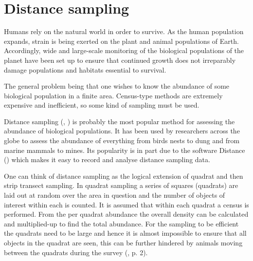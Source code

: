 
\section{Distance sampling}
\label{intro-DS}

Humans rely on the natural world in order to survive. As the human population expands, strain is being exerted on the plant and animal populations of Earth. Accordingly, wide and large-scale monitoring of the biological populations of the planet have been set up to ensure that continued growth does not irreparably damage populations and habitats essential to survival.

The general problem being that one wishes to know the abundance of some biological population in a finite area. Census-type methods are extremely expensive and inefficient, so some kind of sampling must be used. 

Distance sampling (\cite{IDS}, \cite{ADS}) is probably the most popular method for assessing the abundance of biological populations. It has been used by researchers across the globe to assess the abundance of everything from birds nests to dung and from marine mammals to mines. Its popularity is in part due to the software Distance (\cite{distance-software}) which makes it easy to record and analyse distance sampling data.

One can think of distance sampling as the logical extension of quadrat and then strip transect sampling. In quadrat sampling a series of squares (quadrats) are laid out at random over the area in question and the number of objects of interest within each is counted. It is assumed that within each quadrat a census is performed. From the per quadrat abundance the overall density can be calculated and multiplied-up to find the total abundance. For the sampling to be efficient the quadrats need to be large and hence it is almost impossible to ensure that all objects in the quadrat are seen, this can be further hindered by animals moving between the quadrats during the survey (\cite{IDS}, p. 2).


